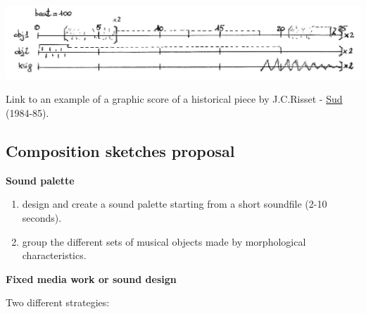 \begin{center}
\includegraphics[scale=1]{../img/scores.png}
\end{center}

Link to an example of a graphic score of a historical piece by J.C.Risset - \href{http://www.musicaecodice.it/gitmedia/emc/3_media/risset1.mp4}{Sud} (1984-85).

\subsection{Composition sketches proposal}\label{composition-sketches-proposal}


\textbf{Sound palette}

\begin{enumerate}
\def\labelenumi{\arabic{enumi}.}
\tightlist
\item design and create a sound palette starting from a short soundfile (2-10 seconds).
\item group the different sets of musical objects made by morphological characteristics.
\end{enumerate}

\textbf{Fixed media work or sound design}

Two different strategies:

